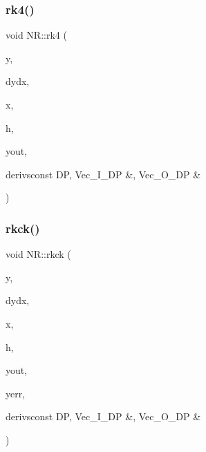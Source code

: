 \subsubsection{\texorpdfstring{rk4()}{rk4()}}
{\footnotesize\ttfamily void N\+R\+::rk4 (\begin{DoxyParamCaption}\item[{\mbox{\hyperlink{namespaceNR_a9f943da53862537c552e2a770cb170ae}{Vec\+\_\+\+I\+\_\+\+DP}} \&}]{y,  }\item[{\mbox{\hyperlink{namespaceNR_a9f943da53862537c552e2a770cb170ae}{Vec\+\_\+\+I\+\_\+\+DP}} \&}]{dydx,  }\item[{const \mbox{\hyperlink{namespaceNR_af6ff762dd605ff477b8e52387253a02a}{DP}}}]{x,  }\item[{const \mbox{\hyperlink{namespaceNR_af6ff762dd605ff477b8e52387253a02a}{DP}}}]{h,  }\item[{\mbox{\hyperlink{namespaceNR_a970094d23441f8ef6a45282a7eb2103d}{Vec\+\_\+\+O\+\_\+\+DP}} \&}]{yout,  }\item[{void }]{derivsconst D\+P, Vec\+\_\+\+I\+\_\+\+D\+P \&, Vec\+\_\+\+O\+\_\+\+D\+P \& }\end{DoxyParamCaption})}

\mbox{\label{namespaceNR_a8fae33790a3dca7e757f1e7bf333b5ba}} 
\subsubsection{\texorpdfstring{rkck()}{rkck()}}
{\footnotesize\ttfamily void N\+R\+::rkck (\begin{DoxyParamCaption}\item[{\mbox{\hyperlink{namespaceNR_a9f943da53862537c552e2a770cb170ae}{Vec\+\_\+\+I\+\_\+\+DP}} \&}]{y,  }\item[{\mbox{\hyperlink{namespaceNR_a9f943da53862537c552e2a770cb170ae}{Vec\+\_\+\+I\+\_\+\+DP}} \&}]{dydx,  }\item[{const \mbox{\hyperlink{namespaceNR_af6ff762dd605ff477b8e52387253a02a}{DP}}}]{x,  }\item[{const \mbox{\hyperlink{namespaceNR_af6ff762dd605ff477b8e52387253a02a}{DP}}}]{h,  }\item[{\mbox{\hyperlink{namespaceNR_a970094d23441f8ef6a45282a7eb2103d}{Vec\+\_\+\+O\+\_\+\+DP}} \&}]{yout,  }\item[{\mbox{\hyperlink{namespaceNR_a970094d23441f8ef6a45282a7eb2103d}{Vec\+\_\+\+O\+\_\+\+DP}} \&}]{yerr,  }\item[{void }]{derivsconst D\+P, Vec\+\_\+\+I\+\_\+\+D\+P \&, Vec\+\_\+\+O\+\_\+\+D\+P \& }\end{DoxyParamCaption})}

